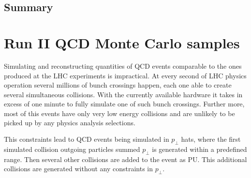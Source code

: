 \subsection{Summary}
\label{SUBSECTION:RunIIPreparation_Summary}





% 
% 
% 
% 

\section{Run II QCD Monte Carlo samples}
\label{SECTION:RunIIPreparation_RunIIQCDMonteCarloSamples}


Simulating and reconstructing quantities of \gls{QCD} events comparable to the ones produced at the \gls{LHC} experiments is impractical. At every second of \gls{LHC} physics operation several millions of bunch crossings happen, each one able to create several simultaneous collisions. With the currently available hardware it takes in excess of one minute to fully simulate one of such bunch crossings. Further more, most of this events have only very low energy collisions and are unlikely to be picked up by any physics analysis selections.  

This constraints lead to \gls{QCD} events being simulated in $p_\perp$ hats, where the first simulated collision outgoing particles summed $p_\perp$ is generated within a predefined range. Then several other collisions are added to the event as \gls{PU}. This additional collisions are generated without any constraints in $p_\perp$. 


